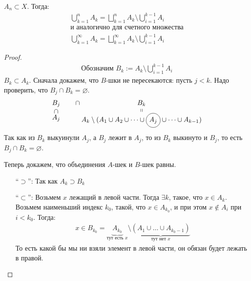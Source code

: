 \begin{lemma}
  $A_n \subset X$. Тогда:
  \begin{gather*}
    \bigcup\limits_{k=1}^n A_k = \bigsqcup\limits_{k=1}^n A_k \setminus \bigcup\limits_{i=1}^{k-1} A_i \\
    \text{и аналогично для счетного множества} \\
    \bigcup\limits_{k=1}^\infty A_k = \bigsqcup\limits_{k=1}^\infty A_k \setminus \bigcup\limits_{i=1}^{k-1} A_i
  \end{gather*}
\end{lemma}

\begin{proof}
  \begin{gather*}
    \text{Обозначим } B_k := A_k \setminus \bigcup_{i=1}^{k-1} A_i
  \end{gather*}
  $B_k \subset A_k$. Сначала докажем, что $B$-шки не пересекаются: пусть $j < k$. Надо проверить, что 
  $B_j \cap B_k = \varnothing$. 
  \begin{gather*}
    \subsetbelow{B_j}{A_j} \qquad \cap \stackbelow{B_k}{A_k \setminus (A_1 \cup A_2 \cup \dots \cup \text{\circled{$A_j$}} \cup \dots \cup A_{k-1})}
  \end{gather*} 
  Так как из $B_k$ выкуинули $A_j$, а $B_j$ лежит в $A_j$, то из $B_k$ выкинуто и $B_j$, то есть $B_j \cap B_k = \varnothing$. 
  
  Теперь докажем, что объединения $A$-шек и $B$-шек равны. 
  \begin{enumerate}
    \item[``$\supset$'':] Так как $A_k \supset B_k$
    \item[``$\subset$'':] Возьмем $x$ лежащий в левой части. Тогда $\exists k$, такое, что 
    $x \in A_k$. Возьмем наименьший индекс $k_0$, такой, что $x \in A_{k_0}$, и при этом $x \notin A_i$ при $i < k_0$.
    Тогда:
    \begin{gather*}
      x \in B_{k_0} = \underbrace{A_{k_0}}_{\text{тут есть } x} \setminus \underbrace{(A_1 \cup \dots \cup A_{k_0 - 1})}_{\text{тут нет } x}
    \end{gather*}
    То есть какой бы мы ни взяли элемент в левой части, он обязан будет лежать в правой.
  \end{enumerate}
\end{proof}
